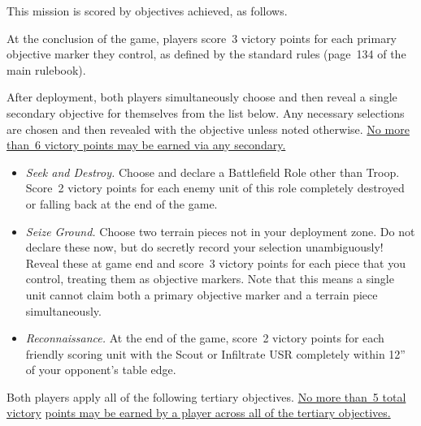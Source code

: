 


This mission is scored by objectives achieved, as follows.

 At the conclusion of the game,
players score~3 victory points for each primary objective marker they
control, as defined by the standard rules (page~134 of the main
rulebook).



After deployment, both players simultaneously choose and then reveal a
single secondary objective for themselves from the list below.  Any
necessary selections are chosen and then revealed with the objective
unless noted otherwise.  \underline{No more than~6 victory points may
  be earned via any secondary.}

\begin{itemize}
\item \textit{Seek and Destroy.}  Choose and declare a Battlefield
  Role other than Troop.  Score~2 victory points for each enemy unit
  of this role completely destroyed or falling back at the end of the
  game.

\item \textit{Seize Ground.}  Choose two terrain pieces not in your
  deployment zone.  Do not declare these now, but do secretly record
  your selection unambiguously!  Reveal these at game end and score~3
  victory points for each piece that you control, treating them as
  objective markers.  Note that this means a single unit cannot claim
  both a primary objective marker and a terrain piece simultaneously.

\item \textit{Reconnaissance.}  At the end of the game, score~2
  victory points for each friendly scoring unit with the Scout or
  Infiltrate USR completely within 12'' of your opponent's table edge.

\end{itemize}


  Both players apply all of
the following tertiary objectives.  \underline{No more than~5 total
  victory} \underline{points may be earned by a player across all of
  the tertiary objectives.}

